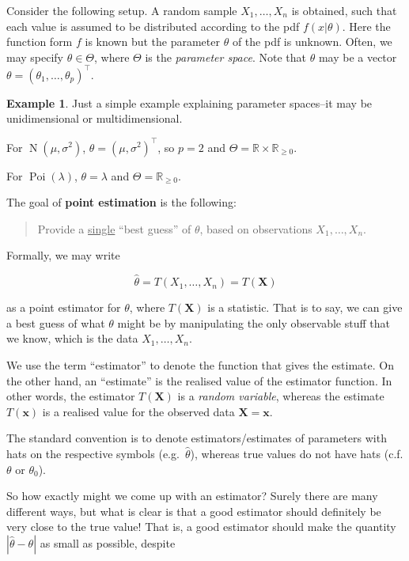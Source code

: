 \documentclass[
]{book}
\newcommand{\bx}{{\boldsymbol x}}
\newcommand{\bX}{{\boldsymbol X}}
\DeclareMathOperator{\N}{N}
\DeclareMathOperator{\Pois}{Poi}
\newcommand{\bbR}{\mathbb{R}}
\theoremstyle{definition}
\theoremstyle{definition}
\newtheorem{example}{Example}[chapter]
\theoremstyle{definition}
\theoremstyle{definition}
\theoremstyle{remark}
\begin{document}
Consider the following setup.
A random sample \(X_1,\dots,X_n\) is obtained, such that each value is assumed to be distributed according to the pdf \(f(x|\theta)\).
Here the function form \(f\) is known but the parameter \(\theta\) of the pdf is unknown.
Often, we may specify \(\theta\in\Theta\), where \(\Theta\) is the \emph{parameter space}.
Note that \(\theta\) may be a vector \(\theta=(\theta_1,\dots,\theta_p)^\top\).

\begin{example}
Just a simple example explaining parameter spaces--it may be unidimensional or multidimensional.

For \(\N(\mu,\sigma^2)\), \(\theta = (\mu,\sigma^2)^\top\), so \(p=2\) and \(\Theta = \bbR \times \bbR_{\geq 0}\).

For \(\Pois(\lambda)\), \(\theta=\lambda\) and \(\Theta=\bbR_{\geq 0}\).
\end{example}

The goal of \textbf{point estimation} is the following:

\begin{quote}
Provide a \uline{single} ``best guess'' of \(\theta\), based on observations \(X_1,\dots,X_n\).
\end{quote}

Formally, we may write

\[
\hat\theta = T(X_1,\dots,X_n) = T(\bX)
\]

as a point estimator for \(\theta\), where \(T(\bX)\) is a statistic.
That is to say, we can give a best guess of what \(\theta\) might be by manipulating the only observable stuff that we know, which is the data \(X_1,\dots,X_n\).

We use the term ``estimator'' to denote the function that gives the estimate.
On the other hand, an ``estimate'' is the realised value of the estimator function.
In other words, the estimator \(T(\bX)\) is a \emph{random variable}, whereas the estimate \(T(\bx)\) is a realised value for the observed data \(\bX=\bx\).

The standard convention is to denote estimators/estimates of parameters with hats on the respective symbols (e.g.~\(\hat\theta\)), whereas true values do not have hats (c.f.
\(\theta\) or \(\theta_0\)).

So how exactly might we come up with an estimator?
Surely there are many different ways, but what is clear is that a good estimator should definitely be very close to the true value!
That is, a good estimator should make the quantity \(|\hat\theta-\theta|\) as small as possible, despite
\end{document}
